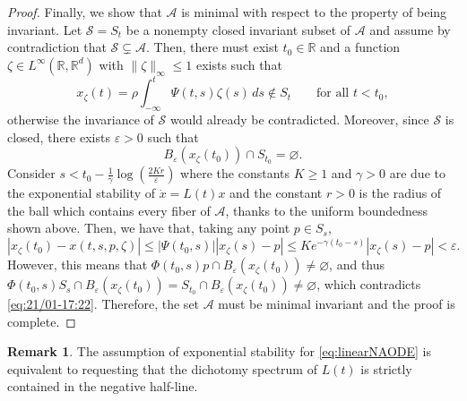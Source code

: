 \documentclass[reqno]{amsart}
\theoremstyle{definition}
\newtheorem{rmk}[thm]{Remark}
\numberwithin{equation}{section}
\newcommand{\R}{\mathbb{R}}
\newcommand{\A}{\mathcal{A}}
\newcommand{\ep}{\varepsilon}
\begin{document}
\begin{proof}
 Finally, we show that     $\A$ is minimal with respect to the property of being invariant. Let $\mathcal{S}={S_t}$ be a nonempty closed invariant subset of $\A$ and assume by contradiction that $\mathcal{S}\subsetneq \A$. Then, there must exist $t_0\in\R$ and a function $\zeta\in L^\infty (\R,\R^d)$ with $\|\zeta\|_\infty\le 1$ exists such that 
\[
x_\zeta(t)=\rho\int_{-\infty}^{t}\Psi(t,s)\zeta(s)\,ds\notin S_t\qquad \text{for all } t<t_0,
\]
otherwise the invariance of $\mathcal{S}$ would already be contradicted. Moreover, since $\mathcal{S}$ is closed, there exists $\ep>0$ such that 
\begin{equation}\label{eq:21/01-17:22}
B_\ep(x_\zeta(t_0))\cap S_{t_0}=\varnothing.
\end{equation}
Consider $s<t_0-\frac{1}{\gamma}\log(\frac{2Kr}{\ep})$ where the constants $K\ge1$ and $\gamma>0$ are due to the exponential stability of $\dot x=L(t)x$ and the constant $r>0$ is the radius of the ball which contains every fiber of $\A$, thanks to the uniform boundedness shown above. Then, we have that, taking any point $p\in S_s$,
\[
|x_\zeta(t_0)-x(t,s,p,\zeta)|\le|\Psi(t_0,s)||x_\zeta(s)-p|\le K e^{-\gamma(t_0-s)}|x_\zeta(s)-p|<\ep.
\]
However, this means that $\Phi(t_0,s)p\cap B_\ep(x_\zeta(t_0))\ne \varnothing$, and thus $\Phi(t_0,s)S_s\cap B_\ep(x_\zeta(t_0))=S_{t_0}\cap B_\ep(x_\zeta(t_0))\ne\varnothing$, which contradicts \eqref{eq:21/01-17:22}. Therefore, the set $\A$ must be minimal invariant and the proof is complete.
\end{proof}


\begin{rmk}
    The assumption of exponential stability for \eqref{eq:linearNAODE} is equivalent to requesting that the dichotomy spectrum of $L(t)$ is strictly contained in the negative half-line. %
\end{rmk}
\end{document}
